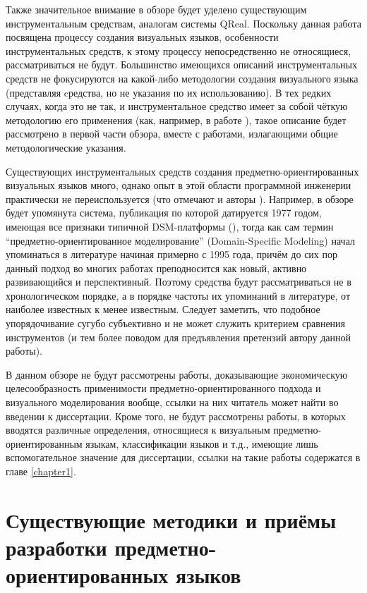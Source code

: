 Также значительное внимание в обзоре будет уделено существующим инструментальным средствам, 
аналогам системы QReal. Поскольку данная работа посвящена процессу создания визуальных 
языков, особенности инструментальных средств, к этому процессу непосредственно не 
относящиеся, рассматриваться не будут.
Большинство имеющихся описаний инструментальных средств не фокусируются на какой-либо методологии создания визуального языка (представляя 
cредства, но не указания по их использованию). В тех редких случаях, когда это не так, 
и инструментальное средство имеет за собой чёткую методологию его применения (как, 
например, в работе \cite{repenning1995agentsheets}), такое описание будет рассмотрено в 
первой части обзора, вместе с работами, излагающими общие методологические указания.

Существующих инструментальных средств создания предметно-ориентированных визуальных 
языков много, однако опыт в этой области программной инженерии практически не переиспользуется 
(что отмечают и авторы \cite{kelly2008domain}). Например, в обзоре будет упомянута 
система, публикация по которой датируется 1977 годом, имеющая все признаки типичной 
DSM-платформы (\cite{teichroew1977psl}), тогда как сам термин "`предметно-ориентированное 
моделирование"' (Domain-Specific Modeling) начал упоминаться в литературе начиная примерно с 
1995 года, 
причём до сих пор данный подход во многих работах преподносится как новый, активно 
развивающийся и перспективный. Поэтому средства будут рассматриваться не в хронологическом 
порядке, а в порядке частоты их упоминаний в литературе, от наиболее известных к менее 
известным. Следует заметить, что подобное упорядочивание сугубо субъективно и не может 
служить критерием сравнения инструментов 
(и тем более поводом для предъявления претензий автору данной работы).

В данном обзоре не будут рассмотрены работы, доказывающие экономическую целесообразность
применимости предметно-ориентированного подхода и визуального моделирования вообще,
ссылки на них читатель может найти во введении к диссертации. Кроме того, не будут
рассмотрены работы, в которых вводятся различные определения, относящиеся к визуальным
предметно-ориентированным языкам, классификации языков и т.д., имеющие лишь вспомогательное
значение для диссертации, ссылки на такие работы содержатся в главе \ref{chapter1}.

\section{Существующие методики и приёмы разработки предметно-ориентированных языков}
